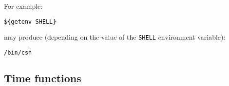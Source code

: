 For example:
\begin{showfile}
\begin{verbatim}
${getenv SHELL}
\end{verbatim}
\end{showfile}
may produce (depending on the value of the \verb+SHELL+ environment variable):
\begin{showfile}
\begin{verbatim}
/bin/csh
\end{verbatim}
\end{showfile}

\subsection{Time functions}
\nopagebreak

